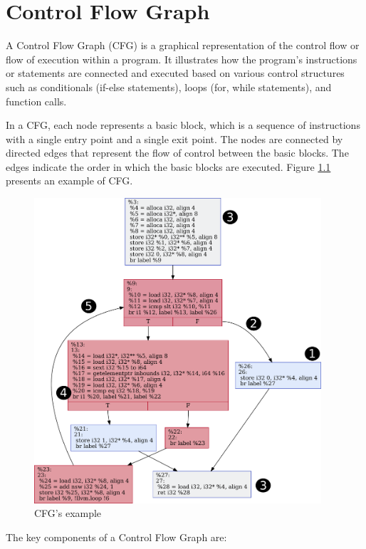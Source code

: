 \chapter{Control Flow Graph}
\label{ch:cfg}

A Control Flow Graph (CFG) is a graphical representation of the control flow or flow of execution within a program. It illustrates how the program's instructions or statements are connected and executed based on various control structures such as conditionals (if-else statements), loops (for, while statements), and function calls.

In a CFG, each node represents a basic block, which is a sequence of instructions with a single entry point and a single exit point. The nodes are connected by directed edges that represent the flow of control between the basic blocks. The edges indicate the order in which the basic blocks are executed. Figure \ref{fig:cfg_numbers} presents an example of CFG.

\begin{figure}[!ht]
    \centering
    \includegraphics[width=0.95\textwidth]{img/cfg_numbers.pdf}
    \caption{CFG's example}
    \label{fig:cfg_numbers}
\end{figure}

The key components of a Control Flow Graph are: 

